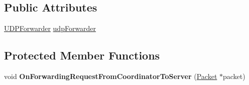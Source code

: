 \subsection*{Public Attributes}
\begin{DoxyCompactItemize}
\item 
\hyperlink{class_rak_net_1_1_u_d_p_forwarder}{U\-D\-P\-Forwarder} \hyperlink{class_rak_net_1_1_u_d_p_proxy_server_a7664fd65087f57acc4d2c602a1a30d24}{udp\-Forwarder}
\end{DoxyCompactItemize}
\subsection*{Protected Member Functions}
\begin{DoxyCompactItemize}
\item 
\hypertarget{class_rak_net_1_1_u_d_p_proxy_server_a89834c4289d07f87ee7851c0b23f1464}{void {\bfseries On\-Forwarding\-Request\-From\-Coordinator\-To\-Server} (\hyperlink{struct_rak_net_1_1_packet}{Packet} $\ast$packet)}\label{class_rak_net_1_1_u_d_p_proxy_server_a89834c4289d07f87ee7851c0b23f1464}

\end{DoxyCompactItemize}
